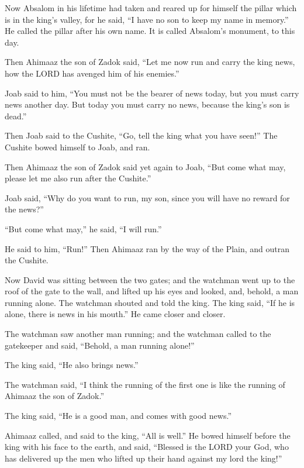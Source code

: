  Now Absalom in his lifetime had taken and reared up for
himself the pillar which is in the king's valley, for he said, ``I have
no son to keep my name in memory.'' He called the pillar after his own
name. It is called Absalom's monument, to this day.

 Then Ahimaaz the son of Zadok said, ``Let me now run and
carry the king news, how the LORD has avenged him of his enemies.''

 Joab said to him, ``You must not be the bearer of news
today, but you must carry news another day. But today you must carry no
news, because the king's son is dead.''

 Then Joab said to the Cushite, ``Go, tell the king what
you have seen!'' The Cushite bowed himself to Joab, and ran.

 Then Ahimaaz the son of Zadok said yet again to Joab,
``But come what may, please let me also run after the Cushite.''

Joab said, ``Why do you want to run, my son, since you will have no
reward for the news?''

 ``But come what may,'' he said, ``I will run.''

He said to him, ``Run!'' Then Ahimaaz ran by the way of the Plain, and
outran the Cushite.

 Now David was sitting between the two gates; and the
watchman went up to the roof of the gate to the wall, and lifted up his
eyes and looked, and, behold, a man running alone.  The
watchman shouted and told the king. The king said, ``If he is alone,
there is news in his mouth.'' He came closer and closer.

 The watchman saw another man running; and the watchman
called to the gatekeeper and said, ``Behold, a man running alone!''

The king said, ``He also brings news.''

 The watchman said, ``I think the running of the first one
is like the running of Ahimaaz the son of Zadok.''

The king said, ``He is a good man, and comes with good news.''

 Ahimaaz called, and said to the king, ``All is well.'' He
bowed himself before the king with his face to the earth, and said,
``Blessed is the LORD your God, who has delivered up the men who lifted
up their hand against my lord the king!''

